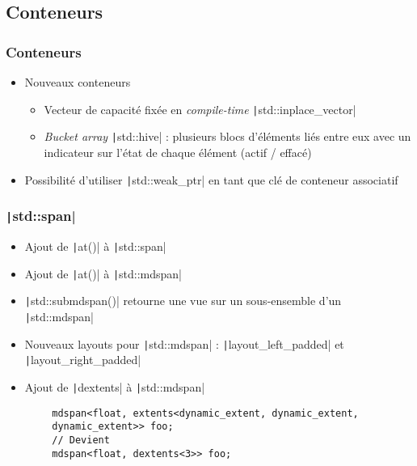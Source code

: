\documentclass[C++.tex]{subfiles}
\begin{document}
\subsection*{Conteneurs}
\begin{frame}[fragile]
	\frametitle{Conteneurs}
	\begin{itemize}
		\item Nouveaux conteneurs
		\begin{itemize}
			\item Vecteur de capacité fixée en \textit{compile-time} \texttt|std::inplace_vector|


			\item \textit{Bucket array} \texttt|std::hive| : plusieurs blocs d'éléments liés entre eux avec un indicateur sur l'état de chaque élément (actif / effacé)

		\end{itemize}
		\item Possibilité d'utiliser \texttt|std::weak_ptr| en tant que clé de conteneur associatif
	\end{itemize}

\end{frame}

\begin{frame}[fragile]
	\frametitle{\texttt|std::span|}
	\begin{itemize}
		\item Ajout de \texttt|at()| à \texttt|std::span|
		\item Ajout de \texttt|at()| à \texttt|std::mdspan|
		\item \texttt|std::submdspan()| retourne une vue sur un sous-ensemble d'un \texttt|std::mdspan|
		\item Nouveaux layouts pour \texttt|std::mdspan| : \texttt|layout_left_padded| et \texttt|layout_right_padded|
		\item Ajout de \texttt|dextents| à \texttt|std::mdspan|
	\end{itemize}

	\begin{verbatim}
		mdspan<float, extents<dynamic_extent, dynamic_extent,
		dynamic_extent>> foo;
		// Devient
		mdspan<float, dextents<3>> foo;
	\end{verbatim}

\end{frame}
\end{document}
